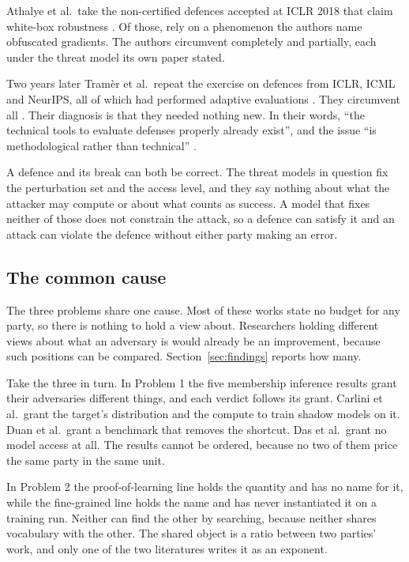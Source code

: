 Athalye et al.\ take the \OGpopulation{} non-certified defences accepted at ICLR
2018 that claim white-box robustness \cite{ACW18}. Of those, \OGobfuscated{} rely on
a phenomenon the authors name obfuscated gradients. The authors circumvent
\OGbrokenFull{} completely and \OGbrokenPart{} partially, each under the threat model
its own paper stated.

Two years later Tram\`er et al.\ repeat the exercise on \AAdefences{} defences from
ICLR, ICML and NeurIPS, all of which had performed adaptive evaluations
\cite{TCBM20}. They circumvent all \AAdefences{}. Their diagnosis is that they needed nothing
new. In their words, ``the technical tools to evaluate defenses properly
already exist'', and the issue ``is methodological rather than technical''
\cite{TCBM20}.

A defence and its break can both be correct. The threat models in question fix the
perturbation set and the access level, and they say nothing about what the attacker
may compute or about what counts as success. A model that fixes neither of those
does not constrain the attack, so a defence can satisfy it and an attack can
violate the defence without either party making an error.

\subsection{The common cause}
\label{sec:problem-cause}

The three problems share one cause. Most of these works state no budget for any
party, so there is nothing to hold a view about. Researchers holding different
views about what an adversary is would already be an improvement, because such
positions can be compared. Section~\ref{sec:findings} reports how many.

Take the three in turn. In Problem 1 the five membership inference results grant
their adversaries different things, and each verdict follows its grant. Carlini et
al.\ grant the target's distribution and the compute to train shadow models on it.
Duan et al.\ grant a benchmark that removes the shortcut. Das et al.\ grant no
model access at all. The results cannot be ordered, because no two of them price
the same party in the same unit.

In Problem 2 the proof-of-learning line holds the quantity and has no name for it,
while the fine-grained line holds the name and has never instantiated it on a
training run. Neither can find the other by searching, because neither shares
vocabulary with the other. The shared object is a ratio between two parties' work,
and only one of the two literatures writes it as an exponent.

